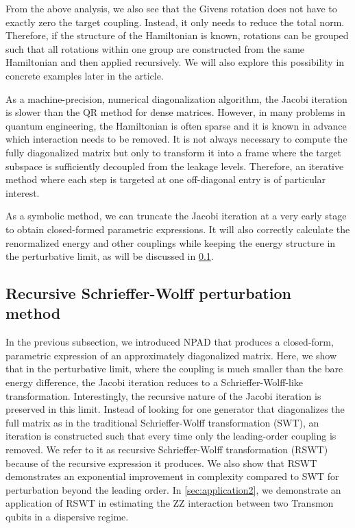 \documentclass[%
 reprint,
 amsmath,amssymb,
 aps,
pra,
noeprint,
superscriptaddress,
]{revtex4-2}
\begin{document}
From the above analysis, we also see that the Givens rotation does not have to exactly zero the target coupling.
Instead, it only needs to reduce the total norm.
Therefore, if the structure of the Hamiltonian is known, rotations can be grouped such that all rotations within one group are constructed from the same Hamiltonian and then applied recursively.
We will also explore this possibility in concrete examples later in the article.

As a machine-precision, numerical diagonalization algorithm, the Jacobi iteration is slower than the QR method for dense matrices.
However, in many problems in quantum engineering, the Hamiltonian is often sparse and it is known in advance which interaction needs to be removed.
It is not always necessary to compute the fully diagonalized matrix but only to transform it into a frame where the target subspace is sufficiently decoupled from the leakage levels.
Therefore, an iterative method where each step is targeted at one off-diagonal entry is of particular interest.

As a symbolic method, we can truncate the Jacobi iteration at a very early stage to obtain closed-formed parametric expressions.
It will also correctly calculate the renormalized energy and other couplings while keeping the energy structure in the perturbative limit, as will be discussed in \cref{sec:RSWT}.


\subsection{Recursive Schrieffer-Wolff perturbation method}
\label{sec:RSWT}
In the previous subsection, we introduced NPAD that produces a closed-form, parametric expression of an approximately diagonalized matrix.
Here, we show that in the perturbative limit, where the coupling is much smaller than the bare energy difference, the Jacobi iteration reduces to a Schrieffer-Wolff-like transformation.
Interestingly, the recursive nature of the Jacobi iteration is preserved in this limit.
Instead of looking for one generator that diagonalizes the full matrix as in the traditional Schrieffer-Wolff transformation (SWT), an iteration is constructed such that every time only the leading-order coupling is removed.
We refer to it as recursive Schrieffer-Wolff transformation (RSWT) because of the recursive expression it produces.
We also show that RSWT demonstrates an exponential improvement in complexity compared to SWT for perturbation beyond the leading order.
In \cref{sec:application2}, we demonstrate an application of RSWT in estimating the ZZ interaction between two Transmon qubits in a dispersive regime.
\end{document}
